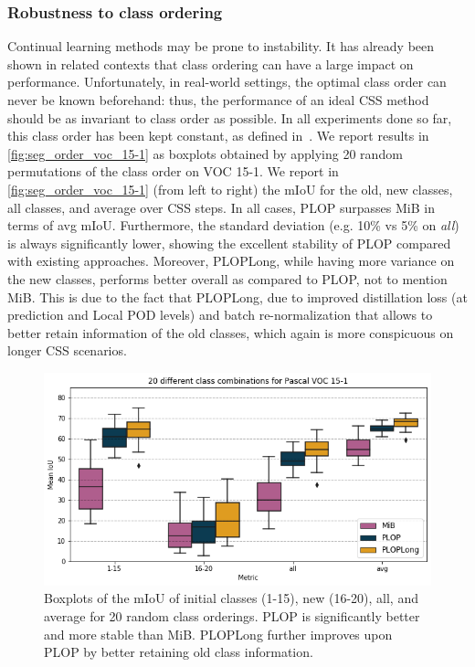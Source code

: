\subsubsection{Robustness to class ordering}

Continual learning methods may be prone to instability. It has already been shown in related
contexts \cite{kim2019medic} that class ordering can have a large impact on performance.
Unfortunately, in real-world settings, the optimal class order can never be known beforehand: thus,
the performance of an ideal \ac{CSS} method should be as invariant to class order as possible. In all
experiments done so far, this class order has been kept constant, as defined
in~\cite{cermelli2020modelingthebackground}. We report results in \autoref{fig:seg_order_voc_15-1}
as boxplots obtained by applying 20 random permutations of the class order on VOC 15-1. We report in
\autoref{fig:seg_order_voc_15-1} (from left to right) the \ac{mIoU} for the old, new classes, all
classes, and average over \ac{CSS} steps. In all cases, PLOP surpasses MiB in terms of avg \ac{mIoU}.
Furthermore, the standard deviation (e.g. 10\% vs 5\% on \textit{all}) is always significantly
lower, showing the excellent stability of PLOP compared with existing approaches. Moreover,
PLOPLong, while having more variance on the new classes, performs better overall as compared to
PLOP, not to mention MiB. This is due to the fact that PLOPLong, due to improved distillation loss
(at prediction and Local POD levels) and batch re-normalization that allows to better retain
information of the old classes, which again is more conspicuous on longer \ac{CSS} scenarios.




\begin{figure}
    \includegraphics[width=\linewidth]{images/seg/order_voc_15-1.png}
    \vspace*{-0.3cm}
    \caption{Boxplots of the \ac{mIoU} of initial classes (1-15), new (16-20), all, and average for
        20 random class orderings. PLOP is significantly better and more stable than MiB. PLOPLong
        further improves upon PLOP by better retaining old class information.}
    \label{fig:seg_order_voc_15-1}
\end{figure}


